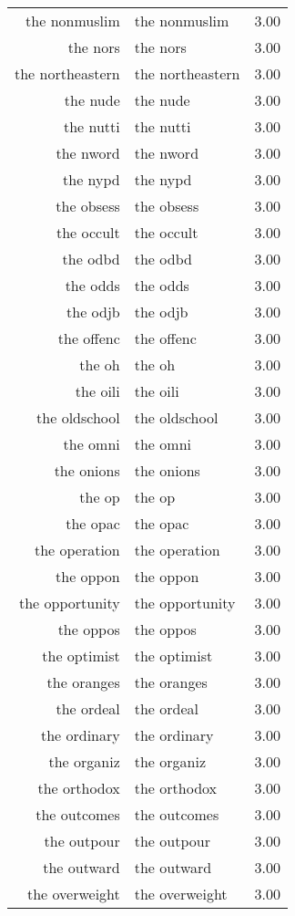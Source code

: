 \begin{table}[ht]
\begin{tabular}{rlr}
  the nonmuslim & the nonmuslim & 3.00 \\ 
  the nors & the nors & 3.00 \\ 
  the northeastern & the northeastern & 3.00 \\ 
  the nude & the nude & 3.00 \\ 
  the nutti & the nutti & 3.00 \\ 
  the nword & the nword & 3.00 \\ 
  the nypd & the nypd & 3.00 \\ 
  the obsess & the obsess & 3.00 \\ 
  the occult & the occult & 3.00 \\ 
  the odbd & the odbd & 3.00 \\ 
  the odds & the odds & 3.00 \\ 
  the odjb & the odjb & 3.00 \\ 
  the offenc & the offenc & 3.00 \\ 
  the oh & the oh & 3.00 \\ 
  the oili & the oili & 3.00 \\ 
  the oldschool & the oldschool & 3.00 \\ 
  the omni & the omni & 3.00 \\ 
  the onions & the onions & 3.00 \\ 
  the op & the op & 3.00 \\ 
  the opac & the opac & 3.00 \\ 
  the operation & the operation & 3.00 \\ 
  the oppon & the oppon & 3.00 \\ 
  the opportunity & the opportunity & 3.00 \\ 
  the oppos & the oppos & 3.00 \\ 
  the optimist & the optimist & 3.00 \\ 
  the oranges & the oranges & 3.00 \\ 
  the ordeal & the ordeal & 3.00 \\ 
  the ordinary & the ordinary & 3.00 \\ 
  the organiz & the organiz & 3.00 \\ 
  the orthodox & the orthodox & 3.00 \\ 
  the outcomes & the outcomes & 3.00 \\ 
  the outpour & the outpour & 3.00 \\ 
  the outward & the outward & 3.00 \\ 
  the overweight & the overweight & 3.00 \\ 

\end{tabular}
\end{table}
